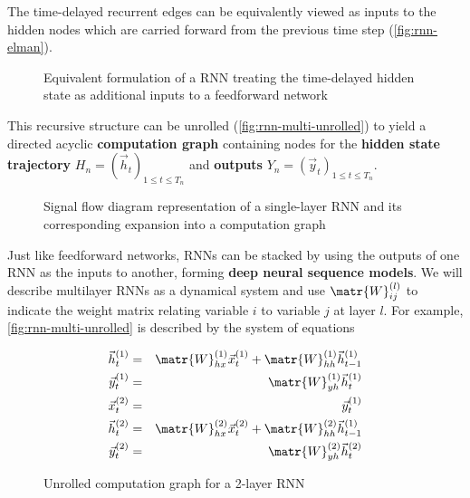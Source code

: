 The time-delayed recurrent edges can be equivalently viewed as inputs to the
hidden nodes which are carried forward from the previous time step
(\autoref{fig:rnn-elman}).

\begin{figure}[htpb]
    \centering
    
    \caption{Equivalent formulation of a RNN treating the time-delayed hidden state
    as additional inputs to a feedforward network}
    \label{fig:rnn-elman}
\end{figure}

This recursive structure can be unrolled
(\autoref{fig:rnn-multi-unrolled}) to yield a directed acyclic
\textbf{computation graph} containing nodes for the
\textbf{hidden state trajectory} $H_n = (\vec{h}_t)_{1 \leq t \leq T_n}$ and
\textbf{outputs} $Y_n = (\vec{y}_t)_{1 \leq t \leq T_n}$.

\begin{figure}[htpb]
    \centering
    
    \caption{Signal flow diagram representation of a single-layer RNN and its corresponding
    expansion into a computation graph}
    \label{fig:rnn-single-unrolled}
\end{figure}

Just like feedforward networks, RNNs can be stacked by using the outputs of one
RNN as the inputs to another, forming \textbf{deep neural sequence models}. We
will describe multilayer RNNs as a dynamical system and use
$\matr{W}^{(l)}_{ij}$ to indicate the weight matrix relating variable $i$ to
variable $j$ at layer $l$. For example, \autoref{fig:rnn-multi-unrolled} is described
by the system of equations

\begin{eqnarray}
    \vec{h}^{(1)}_t &=& \matr{W}^{(1)}_{hx} \vec{x}^{(1)}_t + \matr{W}^{(1)}_{hh} \vec{h}^{(1)}_{t-1} \\
    \vec{y}^{(1)}_t &=& \matr{W}^{(1)}_{yh} \vec{h}^{(1)}_t \\
    \vec{x}^{(2)}_t &=& \vec{y}^{(1)}_t \\
    \vec{h}^{(2)}_t &=& \matr{W}^{(2)}_{hx} \vec{x}^{(2)}_t + \matr{W}^{(2)}_{hh} \vec{h}^{(1)}_{t-1} \\
    \vec{y}^{(2)}_t &=& \matr{W}^{(2)}_{yh} \vec{h}^{(2)}_t \\
\end{eqnarray}

\begin{figure}[htpb]
    \centering
    
    \caption{Unrolled computation graph for a 2-layer RNN}
    \label{fig:rnn-multi-unrolled}
\end{figure}

